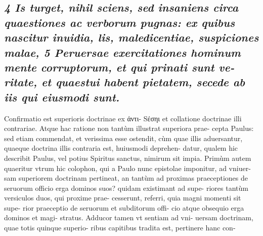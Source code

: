 \documentclass{article}
\begin{document}
\begin{pages}
\subsection*{\textit{4 Is turget, nihil sciens, sed insaniens circa quaestiones ac verborum pugnas: ex quibus nascitur inuidia, lis, maledicentiae, suspiciones malae, 5 Peruersae exercitationes hominum mente corruptorum, et qui prinati sunt ve- ritate, et quaestui habent pietatem, secede ab iis qui eiusmodi sunt. }}\pstart Confirmatio est superioris doctrinae ex ἀντι- Sέσηι et collatione doctrinae illi contrariae. Atque hac ratione non tantùm illustrat superiora prae- cepta Paulus: sed etiam commendat, et verissima esse ostendit, cùm quae illis aduersantur, quaeque doctrina illis contraria est, huiusmodi deprehen- datur, qualem hic describit Paulus, vel potius Spiritus sanctus, nimirum sit impia.  \pend\pstart Primùm autem quaeritur vtrum hic colophon, qui a Paulo nunc epistolae imponitur, ad vniuer- sam superiorem doctrinam pertineat, an tantùm ad proximas praeceptiones de seruorum officio erga dominos suos? quidam existimant ad supe- riores tantùm versiculos duos, qui proxime prae- cesserunt, referri, quia magni momenti sit supe- rior praeceptio de seruorum et subditorum offi- cio atque obsequio erga dominos et magi- stratus. Adducor tamen vt sentiam ad vni- uersam doctrinam, quae totis quinque superio- ribus capitibus tradita est, pertinere hanc con-  \pend
{}
{}
\subsection*{\textit{}}

\end{pages}
\end{document}
